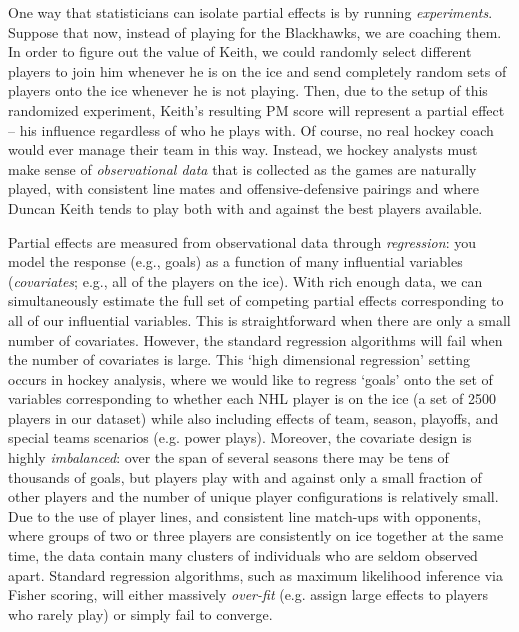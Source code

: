One way that statisticians can isolate partial effects is by running
\textit{experiments}.  Suppose that now, instead of playing for the
Blackhawks, we are coaching them.  In order to figure out the value of Keith,
we could randomly select different players to join him whenever he is on the
ice and send completely random sets of players onto the ice whenever he is not
playing.  Then, due to the setup of this randomized experiment, Keith's
resulting PM score will represent a partial effect -- his influence regardless
of who he plays with.  Of course, no real hockey coach would ever manage their
team in this way.  Instead, we hockey analysts must make sense of
\textit{observational data} that is collected as the games are naturally
played, with consistent line mates and offensive-defensive pairings and where
Duncan Keith tends to play both with and against the best players available.

Partial effects are measured from observational data through
\textit{regression}: you model the response (e.g., goals) as a function of
many  influential variables (\textit{covariates}; e.g., all of the players on
the ice).  With rich enough data, we can simultaneously estimate the full set
of competing partial effects corresponding to all of our influential
variables.  This is straightforward when there are only a small number of
covariates.  However, the standard regression algorithms will fail when the
number of covariates is large. This `high dimensional regression' setting
occurs in hockey analysis, where we would like to regress `goals' onto the set
of variables corresponding to whether each NHL player is on the ice (a set of
2500 players in our dataset) while also including effects of team, season,
playoffs, and special teams scenarios (e.g. power plays).  Moreover, the
covariate design is highly \textit{imbalanced}: over the span of several
seasons there may be  tens of thousands of goals, but players play with and
against only a small fraction of other players and the number of unique player
configurations is relatively small.  Due to the use of player lines, and
consistent line match-ups with opponents, where groups of two or three players
are consistently on ice together at the same time, the data contain many
clusters of individuals who are seldom observed apart.  Standard regression
algorithms, such as maximum likelihood inference via Fisher scoring, will
either massively \textit {over-fit} (e.g. assign large effects to players who
rarely play) or simply fail to converge.

